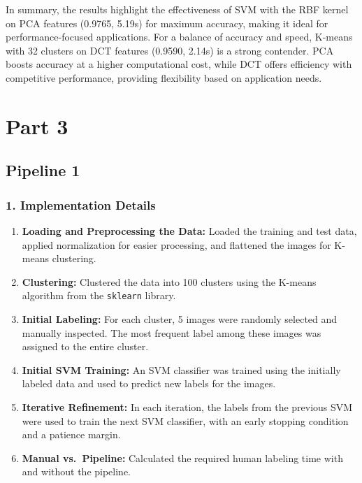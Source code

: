 \documentclass[12pt]{article}
\begin{document}
In summary, the results highlight the effectiveness of SVM with the RBF kernel on PCA features (0.9765, 5.19s) for maximum accuracy, making it ideal for performance-focused applications. For a balance of accuracy and speed, K-means with 32 clusters on DCT features (0.9590, 2.14s) is a strong contender. PCA boosts accuracy at a higher computational cost, while DCT offers efficiency with competitive performance, providing flexibility based on application needs.

\newpage
\section*{Part 3}
\subsection*{Pipeline 1}

\subsubsection*{1. Implementation Details}
\begin{enumerate}
    \item \textbf{Loading and Preprocessing the Data:} Loaded the training and test data, applied normalization for easier processing, and flattened the images for K-means clustering.
    \item \textbf{Clustering:} Clustered the data into 100 clusters using the K-means algorithm from the \texttt{sklearn} library.
    \item \textbf{Initial Labeling:} For each cluster, 5 images were randomly selected and manually inspected. The most frequent label among these images was assigned to the entire cluster.
    \item \textbf{Initial SVM Training:} An SVM classifier was trained using the initially labeled data and used to predict new labels for the images. 
    \item \textbf{Iterative Refinement:} In each iteration, the labels from the previous SVM were used to train the next SVM classifier, with an early stopping condition and a patience margin.  
    \item \textbf{Manual vs.\ Pipeline:} Calculated the required human labeling time with and without the pipeline.
\end{enumerate}
\end{document}
